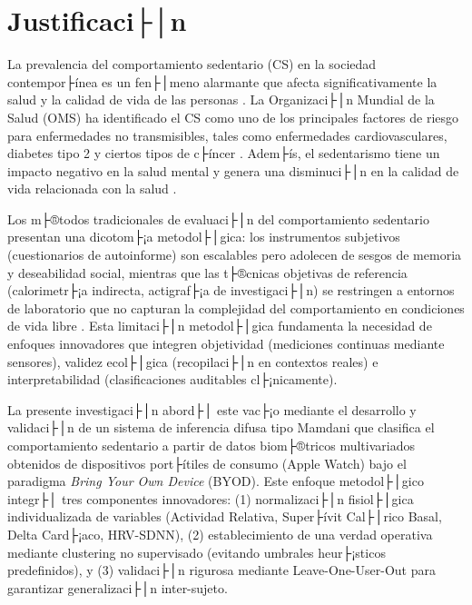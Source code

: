﻿\chapter{Justificaci├│n}
\label{chap:justificacion}

\noindent La prevalencia del comportamiento sedentario (CS) en la sociedad contempor├ínea es un fen├│meno alarmante que afecta significativamente la salud y la calidad de vida de las personas \citep{Guthold2020,Swinburn2019Syndemic}. La Organizaci├│n Mundial de la Salud (OMS) ha identificado el CS como uno de los principales factores de riesgo para enfermedades no transmisibles, tales como enfermedades cardiovasculares, diabetes tipo 2 y ciertos tipos de c├íncer \citep{DiPietro2020Advancing,Murray2020GBD,Okunogbe2021Economic,WHO2009GlobalRisks}. Adem├ís, el sedentarismo tiene un impacto negativo en la salud mental y genera una disminuci├│n en la calidad de vida relacionada con la salud \citep{DiPietro2020Advancing,Guthold2020,Swinburn2019Syndemic}.

Los m├®todos tradicionales de evaluaci├│n del comportamiento sedentario presentan una dicotom├¡a metodol├│gica: los instrumentos subjetivos (cuestionarios de autoinforme) son escalables pero adolecen de sesgos de memoria y deseabilidad social, mientras que las t├®cnicas objetivas de referencia (calorimetr├¡a indirecta, actigraf├¡a de investigaci├│n) se restringen a entornos de laboratorio que no capturan la complejidad del comportamiento en condiciones de vida libre \citep{Healy2024,Prince2008,Migueles2022GRANADA}. Esta limitaci├│n metodol├│gica fundamenta la necesidad de enfoques innovadores que integren objetividad (mediciones continuas mediante sensores), validez ecol├│gica (recopilaci├│n en contextos reales) e interpretabilidad (clasificaciones auditables cl├¡nicamente).

La presente investigaci├│n abord├│ este vac├¡o mediante el desarrollo y validaci├│n de un sistema de inferencia difusa tipo Mamdani que clasifica el comportamiento sedentario a partir de datos biom├®tricos multivariados obtenidos de dispositivos port├ítiles de consumo (Apple Watch) bajo el paradigma \textit{Bring Your Own Device} (BYOD). Este enfoque metodol├│gico integr├│ tres componentes innovadores: (1) normalizaci├│n fisiol├│gica individualizada de variables (Actividad Relativa, Super├ívit Cal├│rico Basal, Delta Card├¡aco, HRV-SDNN), (2) establecimiento de una verdad operativa mediante clustering no supervisado (evitando umbrales heur├¡sticos predefinidos), y (3) validaci├│n rigurosa mediante Leave-One-User-Out para garantizar generalizaci├│n inter-sujeto.

